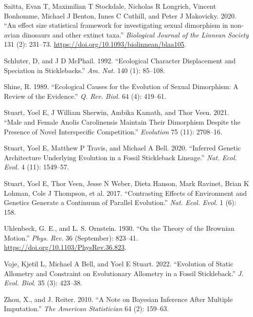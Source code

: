 \documentclass[
  12pt,
]{article}
\newlength{\cslhangindent}
\newlength{\cslentryspacingunit} %
\newenvironment{CSLReferences}[2] %
 {%
  \setlength{\parindent}{0pt}
  \ifodd #1
  \let\oldpar\par
  \def\par{\hangindent=\cslhangindent\oldpar}
  \fi
  \setlength{\parskip}{#2\cslentryspacingunit}
 }%
 {}
\begin{document}
\begin{CSLReferences}{1}{0}
\leavevmode{}%
Saitta, Evan T, Maximilian T Stockdale, Nicholas R Longrich, Vincent
Bonhomme, Michael J Benton, Innes C Cuthill, and Peter J Makovicky.
2020. {``{An effect size statistical framework for investigating sexual
dimorphism in non-avian dinosaurs and other extinct taxa}.''}
\emph{Biological Journal of the Linnean Society} 131 (2): 231--73.
\url{https://doi.org/10.1093/biolinnean/blaa105}.

\leavevmode{}%
Schluter, D, and J D McPhail. 1992. {``Ecological Character Displacement
and Speciation in Sticklebacks.''} \emph{Am. Nat.} 140 (1): 85--108.

\leavevmode{}%
Shine, R. 1989. {``Ecological Causes for the Evolution of Sexual
Dimorphism: A Review of the Evidence.''} \emph{Q. Rev. Biol.} 64 (4):
419--61.

\leavevmode{}%
Stuart, Yoel E, J William Sherwin, Ambika Kamath, and Thor Veen. 2021.
{``Male and Female Anolis Carolinensis Maintain Their Dimorphism Despite
the Presence of Novel Interspecific Competition.''} \emph{Evolution} 75
(11): 2708--16.

\leavevmode{}%
Stuart, Yoel E, Matthew P Travis, and Michael A Bell. 2020. {``Inferred
Genetic Architecture Underlying Evolution in a Fossil Stickleback
Lineage.''} \emph{Nat. Ecol. Evol.} 4 (11): 1549--57.

\leavevmode{}%
Stuart, Yoel E, Thor Veen, Jesse N Weber, Dieta Hanson, Mark Ravinet,
Brian K Lohman, Cole J Thompson, et al. 2017. {``Contrasting Effects of
Environment and Genetics Generate a Continuum of Parallel Evolution.''}
\emph{Nat. Ecol. Evol.} 1 (6): 158.

\leavevmode{}%
Uhlenbeck, G. E., and L. S. Ornstein. 1930. {``On the Theory of the
Brownian Motion.''} \emph{Phys. Rev.} 36 (September): 823--41.
\url{https://doi.org/10.1103/PhysRev.36.823}.

\leavevmode{}%
Voje, Kjetil L, Michael A Bell, and Yoel E Stuart. 2022. {``Evolution of
Static Allometry and Constraint on Evolutionary Allometry in a Fossil
Stickleback.''} \emph{J. Evol. Biol.} 35 (3): 423--38.

\leavevmode{}%
Zhou, X., and J. Reiter. 2010. {``A Note on Bayesian Inference After
Multiple Imputation.''} \emph{The American Statistician} 64 (2):
159--63.

\end{CSLReferences}
\end{document}

